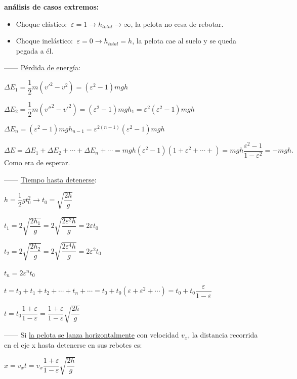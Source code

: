 \textbf{análisis de casos extremos:}

\begin{itemize}
\item Choque elástico: $\ \varepsilon=1 \to h_{total}\to \infty$, la pelota no cesa de rebotar.
\item Choque inelástico: $\ \varepsilon=0\to h_{total}=h$, la pelota cae al suelo y se queda pegada a él.	
\end{itemize}

------ \underline{Pérdida de energía}:

$\Delta E_1=\dfrac 1 2 m (v'^2-v^2)=(\varepsilon^2-1)mgh$

$\Delta E_2=\dfrac 1 2 m (v''^2-v'^2)=(\varepsilon^2-1)mgh_1= \varepsilon^2(\varepsilon^2-1)mgh$

$\Delta E_n=(\varepsilon^2-1)mgh_{n-1}=\varepsilon^{2(n-1)}(\varepsilon^2-1)mgh$

$\Delta E=\Delta E_1+\Delta E_2+ \cdots + \Delta E_n+\cdots =mgh(\varepsilon^2-1)(1+\varepsilon^2+\cdots + )=mgh\dfrac{\varepsilon^2-1}{1-\varepsilon^2}=-mgh.\quad $Como era de esperar.

------ \underline{Tiempo hasta detenerse}:

$h=\dfrac 1 2 gt_0^2 \to t_0=\sqrt{\dfrac {2h}{g}}$

$t_1=2 \sqrt{\dfrac{2h_1}{g}}=2\sqrt{\dfrac{2\varepsilon^2 h}{g}}=2\varepsilon t_0$

$t_2=2\sqrt{\dfrac{2h_2}{g}}=2\sqrt{\dfrac{2\varepsilon^4h}{g}}=2\varepsilon^2 t_0$

$t_n=2\varepsilon^n t_0$

$t=t_0+t_1+t_2+ \cdots + t_n+\cdots =t_0+t_0(\varepsilon+\varepsilon^2+\cdots )=t_0+t_0 \dfrac{\varepsilon}{1-\varepsilon}$

$t=t_0\dfrac{1+\varepsilon}{1-\varepsilon}=\dfrac{1+\varepsilon}{1-\varepsilon} \sqrt{\dfrac{2h}{g}}$

------ Si \underline{la pelota se lanza horizontalmente} con velocidad $v_x$, la distancia recorrida en el eje x hasta detenerse en sus rebotes es:

$x=v_x t=v_x \dfrac{1+\varepsilon}{1-\varepsilon} \sqrt{\dfrac{2h}{g}}$




